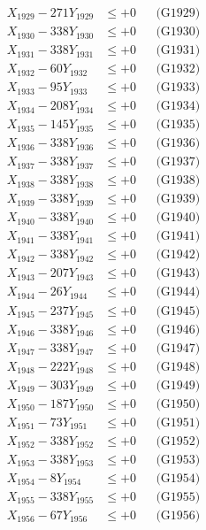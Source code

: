 \documentclass[a4paper,10pt]{article}
\begin{document}
{\begin{align}
X_{1929} - 271Y_{1929} &\leq +0 && \text{(G1929)} \\
X_{1930} - 338Y_{1930} &\leq +0 && \text{(G1930)} \\
\allowbreak
X_{1931} - 338Y_{1931} &\leq +0 && \text{(G1931)} \\
X_{1932} - 60Y_{1932} &\leq +0 && \text{(G1932)} \\
X_{1933} - 95Y_{1933} &\leq +0 && \text{(G1933)} \\
X_{1934} - 208Y_{1934} &\leq +0 && \text{(G1934)} \\
X_{1935} - 145Y_{1935} &\leq +0 && \text{(G1935)} \\
X_{1936} - 338Y_{1936} &\leq +0 && \text{(G1936)} \\
X_{1937} - 338Y_{1937} &\leq +0 && \text{(G1937)} \\
X_{1938} - 338Y_{1938} &\leq +0 && \text{(G1938)} \\
X_{1939} - 338Y_{1939} &\leq +0 && \text{(G1939)} \\
X_{1940} - 338Y_{1940} &\leq +0 && \text{(G1940)} \\
\allowbreak
X_{1941} - 338Y_{1941} &\leq +0 && \text{(G1941)} \\
X_{1942} - 338Y_{1942} &\leq +0 && \text{(G1942)} \\
X_{1943} - 207Y_{1943} &\leq +0 && \text{(G1943)} \\
X_{1944} - 26Y_{1944} &\leq +0 && \text{(G1944)} \\
X_{1945} - 237Y_{1945} &\leq +0 && \text{(G1945)} \\
X_{1946} - 338Y_{1946} &\leq +0 && \text{(G1946)} \\
X_{1947} - 338Y_{1947} &\leq +0 && \text{(G1947)} \\
X_{1948} - 222Y_{1948} &\leq +0 && \text{(G1948)} \\
X_{1949} - 303Y_{1949} &\leq +0 && \text{(G1949)} \\
X_{1950} - 187Y_{1950} &\leq +0 && \text{(G1950)} \\
\allowbreak
X_{1951} - 73Y_{1951} &\leq +0 && \text{(G1951)} \\
X_{1952} - 338Y_{1952} &\leq +0 && \text{(G1952)} \\
X_{1953} - 338Y_{1953} &\leq +0 && \text{(G1953)} \\
X_{1954} - 8Y_{1954} &\leq +0 && \text{(G1954)} \\
X_{1955} - 338Y_{1955} &\leq +0 && \text{(G1955)} \\
X_{1956} - 67Y_{1956} &\leq +0 && \text{(G1956)} \\

\end{align}}
\end{document}
